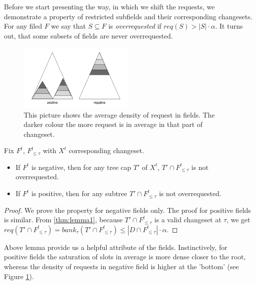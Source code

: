 Before we start presenting the way, in which we shift the requests, we
demonstrate a property of restricted subfields and their corresponding changesets.
For any filed $F$ we say that $S \subseteq F$ is \textit{overrequested}
if $req(S) > |S| \cdot \alpha$. It turns out, that some subsets of fields
are never overrequested.
\begin{figure}
\vspace{-20pt}
 \begin{center}
  \includegraphics[width=0.5\textwidth]{density_pic.png}
\end{center}
\caption{This picture shows the average density of request in fields. The 
darker colour the more request is in average in that part of changeset.}
\vspace{-40pt}
\label{fig:density}
\end{figure}
\begin{lemma}
Fix $F^t$, $F^t_{\leq \tau}$ with $X^t$ corresponding changeset.
\begin{itemize}
 \item If $F^t$ is negative, then for any tree cap $T'$ of $X^t$, $T' \cap 
F^t_{\leq \tau}$ is not overrequested.
\item If $F^t$ is positive, then for any subtree $T'\cap F^t_{\leq \tau}$ is not 
overrequested.
\end{itemize}
\label{thm:not_over_requested}
\end{lemma}
\begin{proof}
We prove the property for negative fields only. The proof for positive fields
is similar. From \ref{thm:lemma1}, because $T' \cap  F^t_{\leq \tau}$ is a valid 
changeset at $\tau$, we get $req(T' \cap  F^t_{\leq \tau}) = bank_{\tau}(T' 
\cap F^t_{\leq \tau}) \leq |D \cap F^t_{\leq \tau}| \cdot \alpha$.
\end{proof}

Above lemma provide us a helpful attribute of the fields. Instinctively, for positive 
fields the saturation of slots in average is more dense closer to 
the root, whereas the density of requests in negative field is higher at the 
'bottom' (see Figure \ref{fig:density}).

